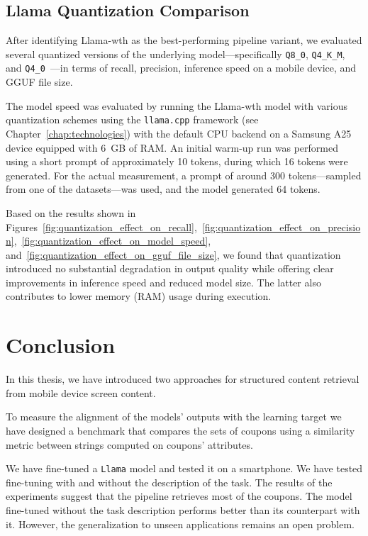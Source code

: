 \documentclass[licencjacka,en]{pracamgr}
\begin{document}
\section{Llama Quantization Comparison}

After identifying Llama-wth as the best-performing pipeline variant, we evaluated several quantized versions of the underlying model—specifically \texttt{Q8\_0}, \texttt{Q4\_K\_M}, and \texttt{Q4\_0}~\cite{llama-cpp-quantization}—in terms of recall, precision, inference speed on a mobile device, and GGUF file size. 

The model speed was evaluated by running the Llama-wth model with various quantization schemes using the \texttt{llama.cpp} framework (see Chapter~\ref{chap:technologies}) with the default CPU backend on a Samsung A25 device equipped with 6~GB of RAM. An initial warm-up run was performed using a short prompt of approximately 10 tokens, during which 16 tokens were generated. For the actual measurement, a prompt of around 300 tokens—sampled from one of the datasets—was used, and the model generated 64 tokens.

Based on the results shown in Figures~\ref{fig:quantization_effect_on_recall},~\ref{fig:quantization_effect_on_precision},~\ref{fig:quantization_effect_on_model_speed}, and~\ref{fig:quantization_effect_on_gguf_file_size}, we found that quantization introduced no substantial degradation in output quality while offering clear improvements in inference speed and reduced model size. The latter also contributes to lower memory (RAM) usage during execution.

\chapter{Conclusion} \label{chap:conclusion}
In this thesis, we have introduced two approaches for structured content retrieval from mobile device screen content.

To measure the alignment of the models' outputs with the learning target we have designed a benchmark that compares the sets of coupons using a similarity metric between strings computed on coupons' attributes.

We have fine-tuned a \texttt{Llama} model and tested it on a smartphone. We have tested fine-tuning with and without the description of the task. The results of the experiments suggest that the pipeline retrieves most of the coupons. The model fine-tuned without the task description performs better than its counterpart with it. However, the generalization to unseen applications remains an open problem.
\end{document}
